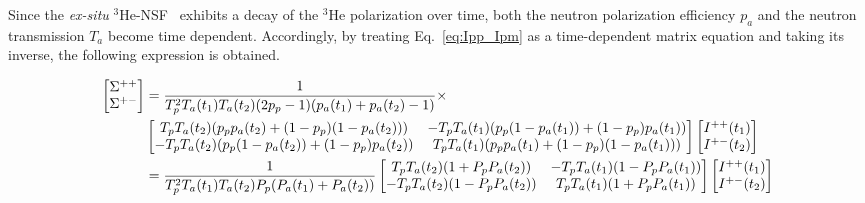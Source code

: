 \documentclass[%
 reprint,
superscriptaddress,
 amsmath,amssymb,
 aps,
]{revtex4-2}
\newcommand{\He}{$^3$He }
\newcommand{\Hensf}{$^3$He-NSF}
\begin{document}
Since the \textit{ex-situ} \Hensf~ exhibits a decay of the \He polarization over time, both the neutron polarization efficiency $p_a$ and the neutron transmission $T_a$ become time dependent.
Accordingly, by treating Eq.~\ref{eq:Ipp_Ipm} as a time-dependent matrix equation and taking its inverse, the following expression is obtained.
\begin{widetext}
    \begin{align}
        \begin{bmatrix}
            \Sigma^{++} \\
            \Sigma^{+-}
        \end{bmatrix}
        &=\frac{1}{T_p^2 T_a(t_1) T_a(t_2) (2p_p -1)(p_a(t_1)+p_a(t_2) -1)} \times \notag\\
        &\begin{bmatrix}
            T_p T_a(t_2) (p_p p_a(t_2) + (1-p_p)(1-p_a(t_2))) & -T_p T_a(t_1) (p_p (1-p_a(t_1)) + (1-p_p) p_a(t_1)) \\
            -T_p T_a(t_2) (p_p (1-p_a(t_2)) + (1-p_p) p_a(t_2)) & T_p T_a(t_1) (p_p p_a(t_1) + (1-p_p)(1-p_a(t_1))) \\
        \end{bmatrix}
        \begin{bmatrix}
            I^{++}(t_1) \\
            I^{+-}(t_2)
        \end{bmatrix}
        \notag\\
        &=\frac{1}{T_p^2T_a(t_1)T_a(t_2)P_p(P_a(t_1)+P_a(t_2))}
        \begin{bmatrix}
            T_pT_a(t_2)(1+P_pP_a(t_2)) & -T_pT_a(t_1)(1-P_pP_a(t_1)) \\
            -T_pT_a(t_2)(1-P_pP_a(t_2)) & T_pT_a(t_1)(1+P_pP_a(t_1)) \\
\end{bmatrix}
\begin{bmatrix}
    I^{++}(t_1) \\
    I^{+-}(t_2)
\end{bmatrix}
\label{eq:Sigma}
\end{align}
\end{widetext}
\end{document}
